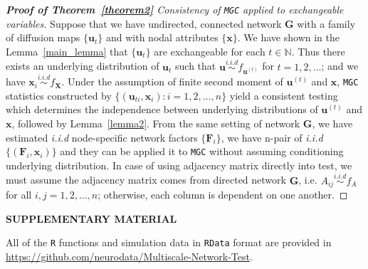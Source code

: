 \documentclass[12pt]{article}
\theoremstyle{definition}
\begin{document}
\begin{proof}[\textbf{Proof of Theorem~\ref{theorem2}} Consistency of \texttt{MGC} applied to exchangeable variables]

Suppose that we have undirected, connected network $\mathbf{G}$ with a family of diffusion maps $\{ \mathbf{u}_{t}  \}$ and with nodal attributes $\{ \mathbf{x}  \}$. We have shown in the Lemma~\ref{main_lemma} that $\{ \mathbf{u}_{t}  \}$ are exchangeable for each $t \in \mathbb{N}$. Thus there exists an underlying distribution of $\mathbf{u}_{t}$ such that $\mathbf{u} \overset{i.i.d}{\sim} f_{\mathbf{u}^{(t)}}$ for $t= 1,2,\ldots $; and we have $\mathbf{x}_{i} \overset{i.i.d}{\sim} f_{\mathbf{X}}$. Under the assumption of finite second moment of $\mathbf{u}^{(t)}$ and $\mathbf{x}$, \texttt{MGC} statistics constructed by $\{  (  \mathbf{u}_{ti}, \mathbf{x}_{i} ) : i = 1,2,\ldots, n  \}$ yield a consistent testing which determines the independence between underlying distributions of $\mathbf{u}^{(t)}$ and $\mathbf{x}$, followed by Lemma~\ref{lemma2}. 
From the same setting of network $\mathbf{G}$, we have estimated \textit{i.i.d} node-specific network factors $\{ \mathbf{F}_{i} \}$, we have n-pair of \textit{i.i.d} $\{ ( \mathbf{F}_{i}, \mathbf{x}_{i} )  \}$ and they can be applied it to \texttt{MGC} without assuming conditioning underlying distribution. In case of using adjacency matrix directly into test, we must assume the adjacency matrix comes from directed network $\mathbf{G}$, i.e. $A_{ij} \overset{i.i.d}{\sim} f_{A}$ for all $i,j=1,2,\ldots, n$; otherwise, each column is dependent on one another.  
\end{proof}




	
\bigskip
\begin{center}
	{\large\bf SUPPLEMENTARY MATERIAL}
\end{center}
	
All of the \texttt{R} functions and simulation data in \texttt{RData} format are provided in \url{https://github.com/neurodata/Multiscale-Network-Test}.
	
	
\end{document}
